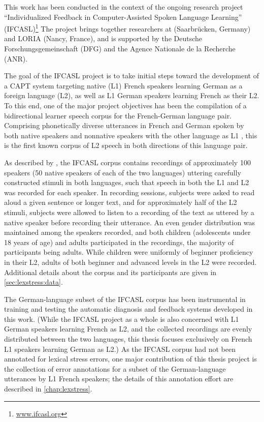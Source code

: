 This work has been conducted in the context of the ongoing 
research project ``Individualized Feedback in Computer-Assisted Spoken Language Learning'' (IFCASL)\footnote{\url{www.ifcasl.org}}
The project brings together researchers 
 at 
{\thesisUniversity} 
 (Saarbrücken, Germany) and LORIA (Nancy, France), and 
is supported by the Deutsche Forschungsgemeinschaft (DFG) and the Agence Nationale de la Recherche (ANR).

The goal of the IFCASL project is to take initial steps toward the development of a CAPT system targeting
native (L1) French speakers learning German as a foreign language (L2), 
as well as
L1 German speakers learning French as their L2. To this end, one of the major project objectives has been the compilation of a bidirectional learner speech corpus for the French-German language pair. Comprising phonetically diverse utterances in French and German spoken by both native speakers and nonnative speakers with the other language as L1 \citep{Fauth2014,Trouvain2013}, this is the first known corpus of L2 speech in both directions of this language pair.

As described by \textcite{Trouvain2013,Fauth2014}, the IFCASL corpus contains recordings of approximately 100 speakers (50 native speakers of each of the two languages) uttering carefully constructed stimuli in both languages, such that speech in both the L1 and L2 was recorded for each speaker. In recording sessions, subjects were asked to read aloud a given sentence or longer text, and for approximately half of the L2 stimuli, subjects were allowed to listen to a recording of the text as uttered by a native speaker 
before recording their utterance. An even gender distribution was maintained among the speakers recorded, and both children (adolescents under 18 years of age) and adults participated in the recordings, the majority of participants being adults. While children were uniformly of beginner proficiency in their L2, adults of both beginner and advanced levels in the L2 were recorded. Additional details about the corpus and its participants are given in \cref{sec:lexstress:data}.


The German-language subset of the IFCASL corpus has been instrumental in training and testing the automatic diagnosis and feedback systems developed in this work.
 (While the IFCASL project as a whole is also concerned with L1 German speakers learning French as L2, and the 
 collected recordings are
 evenly distributed between the two languages, this thesis focuses exclusively on French L1 speakers learning German as L2.) 
As the IFCASL corpus had not been annotated for lexical stress errors, one major contribution of this thesis project is 
the collection of error annotations 
for a subset of the German-language utterances by L1 French speakers; the details of this annotation effort are described in \cref{chap:lexstress}. 


